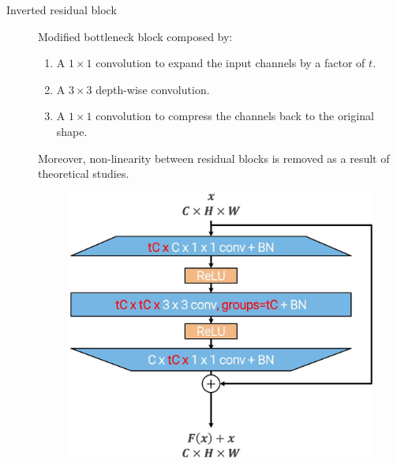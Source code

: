 \begin{description}
    \item[Inverted residual block] 
        Modified bottleneck block composed by:
        \begin{enumerate}
            \item A $1 \times 1$ convolution to expand the input channels by a factor of $t$. 
            \item A $3 \times 3$ depth-wise convolution.
            \item A $1 \times 1$ convolution to compress the channels back to the original shape.
        \end{enumerate}
        Moreover, non-linearity between residual blocks is removed as a result of theoretical studies.

        \begin{figure}[H]
            \centering
            \includegraphics[width=0.4\linewidth]{./img/_inverted_residual.jpg}
        \end{figure}
\end{description}

